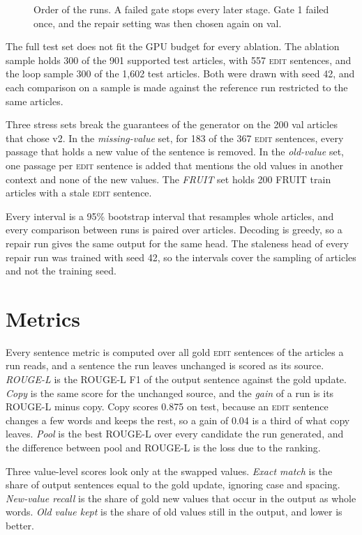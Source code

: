 \documentclass[]{paper}
\newcommand{\edit}{\textsc{edit}}
\begin{document}
\begin{figure}[t]
\centering

\caption{Order of the runs. A failed gate stops every later stage. Gate 1 failed once, and the repair setting was then chosen again on val.}
\label{fig:order}
\end{figure}

The full test set does not fit the GPU budget for every ablation. The ablation sample holds 300 of the 901 supported test articles, with 557 \edit{} sentences, and the loop sample 300 of the 1,602 test articles. Both were drawn with seed 42, and each comparison on a sample is made against the reference run restricted to the same articles.

Three stress sets break the guarantees of the generator on the 200 val articles that chose v2. In the \emph{missing-value} set, for 183 of the 367 \edit{} sentences, every passage that holds a new value of the sentence is removed. In the \emph{old-value} set, one passage per \edit{} sentence is added that mentions the old values in another context and none of the new values. The \emph{FRUIT} set holds 200 FRUIT train articles with a stale \edit{} sentence.

Every interval is a 95\% bootstrap interval that resamples whole articles, and every comparison between runs is paired over articles. Decoding is greedy, so a repair run gives the same output for the same head. The staleness head of every repair run was trained with seed 42, so the intervals cover the sampling of articles and not the training seed.

\section{Metrics}
\label{sec:metrics}

Every sentence metric is computed over all gold \edit{} sentences of the articles a run reads, and a sentence the run leaves unchanged is scored as its source. \emph{ROUGE-L} is the ROUGE-L F1 of the output sentence against the gold update. \emph{Copy} is the same score for the unchanged source, and the \emph{gain} of a run is its ROUGE-L minus copy. Copy scores 0.875 on test, because an \edit{} sentence changes a few words and keeps the rest, so a gain of 0.04 is a third of what copy leaves. \emph{Pool} is the best ROUGE-L over every candidate the run generated, and the difference between pool and ROUGE-L is the loss due to the ranking.

Three value-level scores look only at the swapped values. \emph{Exact match} is the share of output sentences equal to the gold update, ignoring case and spacing. \emph{New-value recall} is the share of gold new values that occur in the output as whole words. \emph{Old value kept} is the share of old values still in the output, and lower is better.
\end{document}
